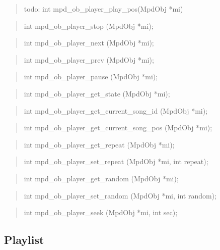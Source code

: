 \documentclass[a4paper,11pt]{article}
\begin{document}
\begin{quote}
todo: int mpd\_ob\_player\_play\_pos(MpdObj *mi)
\end{quote}

\begin{quote}
int   mpd\_ob\_player\_stop   (MpdObj *mi);
\end{quote}

\begin{quote}
int   mpd\_ob\_player\_next   (MpdObj *mi);
\end{quote}

\begin{quote}
int   mpd\_ob\_player\_prev   (MpdObj *mi);
\end{quote}

\begin{quote}
int   mpd\_ob\_player\_pause   (MpdObj *mi);
\end{quote}

\begin{quote}
int   mpd\_ob\_player\_get\_state   (MpdObj *mi);
\end{quote}

\begin{quote}
int   mpd\_ob\_player\_get\_current\_song\_id (MpdObj *mi);
\end{quote}

\begin{quote}
int   mpd\_ob\_player\_get\_current\_song\_pos (MpdObj *mi);
\end{quote}

\begin{quote}
int  mpd\_ob\_player\_get\_repeat  (MpdObj *mi);
\end{quote}

\begin{quote}
int  mpd\_ob\_player\_set\_repeat  (MpdObj *mi, int repeat);
\end{quote}

\begin{quote}
int  mpd\_ob\_player\_get\_random  (MpdObj *mi);
\end{quote}

\begin{quote}
int  mpd\_ob\_player\_set\_random  (MpdObj *mi, int random);
\end{quote}

\begin{quote}
int   mpd\_ob\_player\_seek   (MpdObj *mi, int sec);
\end{quote}

\subsection{Playlist}
\end{document}
